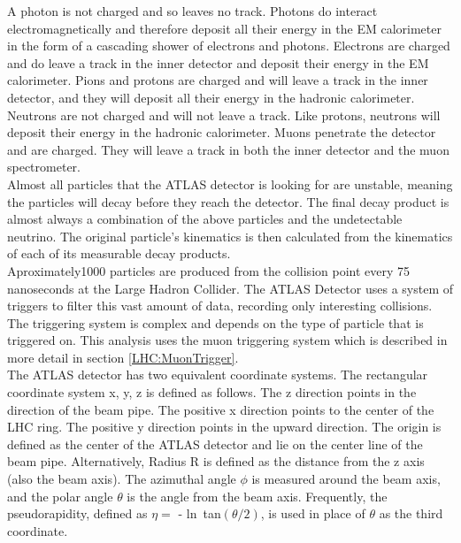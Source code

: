 \indent A photon is not charged and so leaves no track. Photons do interact electromagnetically and therefore deposit all their energy in the EM calorimeter in the form of a cascading shower of electrons and photons. Electrons are charged and do leave a track in the inner detector and deposit their energy in the EM calorimeter. Pions and protons are charged and will leave a track in the inner detector, and they will deposit all their energy in the hadronic calorimeter. Neutrons are not charged and will not leave a track. Like protons, neutrons will deposit their energy in the hadronic calorimeter. Muons penetrate the detector and are charged. They will leave a track in both the inner detector and the muon spectrometer. ~\\
\indent Almost all particles that the ATLAS detector is looking for are unstable, meaning the particles will decay before they reach the detector. The final decay product is almost always a combination of the above particles and the undetectable neutrino. The original particle's kinematics is then calculated from the kinematics of each of its measurable decay products. ~\\
\indent Aproximately1000 particles are produced from the collision point every 75 nanoseconds at the Large Hadron Collider.\cite{biblio:JINST} The ATLAS Detector uses a system of triggers to filter this vast amount of data, recording only interesting collisions. The triggering system is complex and depends on the type of particle that is triggered on. This analysis uses the muon triggering system which is described in more detail in section \ref{LHC:MuonTrigger}. ~\\
\indent The ATLAS detector has two equivalent coordinate systems. The rectangular coordinate system x, y, z is defined as follows. The z direction points in the direction of the beam pipe. The positive x direction points to the center of the LHC ring. The positive y direction points in the upward direction. The origin is defined as the center of the ATLAS detector and lie on the center line of the beam pipe. Alternatively, Radius R is defined as the distance from the z axis (also the beam axis). The azimuthal angle $\phi$ is measured around the beam axis, and the polar angle $\theta$ is the angle from the beam axis. Frequently, the pseudorapidity, defined as $\eta =$ - ln~tan$({\theta}/2)$, is used in place of $\theta$ as the third coordinate. ~\\
